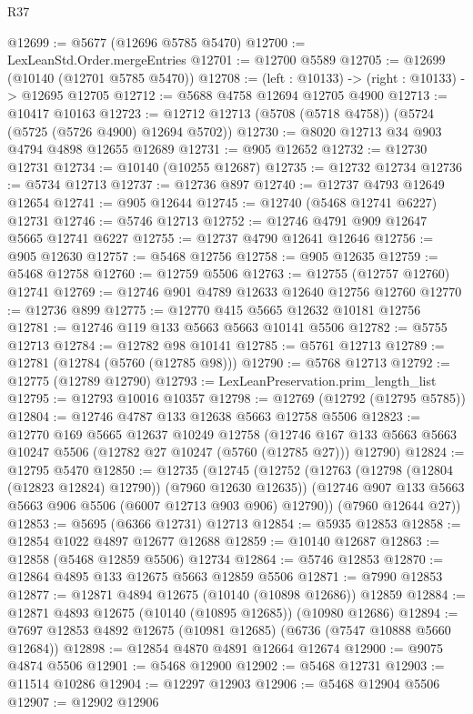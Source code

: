 \begin{lexlean}{R37}
\begin{coremodule}
@12699 := @5677 (@12696 @5785 @5470)
@12700 := LexLeanStd.Order.mergeEntries
@12701 := @12700 @5589
@12705 := @12699 (@10140 (@12701 @5785 @5470))
@12708 := (left : @10133) -> (right : @10133) -> @12695 @12705
@12712 := @5688 @4758 @12694 @12705 @4900
@12713 := @10417 @10163
@12723 := @12712 @12713 (@5708 (@5718 @4758)) (@5724 (@5725 (@5726 @4900) @12694 @5702))
@12730 := @8020 @12713 @34 @903 @4794 @4898 @12655 @12689
@12731 := @905 @12652
@12732 := @12730 @12731
@12734 := @10140 (@10255 @12687)
@12735 := @12732 @12734
@12736 := @5734 @12713
@12737 := @12736 @897
@12740 := @12737 @4793 @12649 @12654
@12741 := @905 @12644
@12745 := @12740 (@5468 @12741 @6227) @12731
@12746 := @5746 @12713
@12752 := @12746 @4791 @909 @12647 @5665 @12741 @6227
@12755 := @12737 @4790 @12641 @12646
@12756 := @905 @12630
@12757 := @5468 @12756
@12758 := @905 @12635
@12759 := @5468 @12758
@12760 := @12759 @5506
@12763 := @12755 (@12757 @12760) @12741
@12769 := @12746 @901 @4789 @12633 @12640 @12756 @12760
@12770 := @12736 @899
@12775 := @12770 @415 @5665 @12632 @10181 @12756
@12781 := @12746 @119 @133 @5663 @5663 @10141 @5506
@12782 := @5755 @12713
@12784 := @12782 @98 @10141
@12785 := @5761 @12713
@12789 := @12781 (@12784 (@5760 (@12785 @98)))
@12790 := @5768 @12713
@12792 := @12775 (@12789 @12790)
@12793 := LexLeanPreservation.prim_length_list
@12795 := @12793 @10016 @10357
@12798 := @12769 (@12792 (@12795 @5785))
@12804 := @12746 @4787 @133 @12638 @5663 @12758 @5506
@12823 := @12770
    @169
    @5665
    @12637
    @10249
    @12758
    (@12746 @167 @133 @5663 @5663 @10247 @5506 (@12782 @27 @10247 (@5760 (@12785 @27))) @12790)
@12824 := @12795 @5470
@12850 := @12735
    (@12745
      (@12752
        (@12763 (@12798 (@12804 (@12823 @12824) @12790)) (@7960 @12630 @12635))
        (@12746 @907 @133 @5663 @5663 @906 @5506 (@6007 @12713 @903 @906) @12790))
      (@7960 @12644 @27))
@12853 := @5695 (@6366 @12731) @12713
@12854 := @5935 @12853
@12858 := @12854 @1022 @4897 @12677 @12688
@12859 := @10140 @12687
@12863 := @12858 (@5468 @12859 @5506) @12734
@12864 := @5746 @12853
@12870 := @12864 @4895 @133 @12675 @5663 @12859 @5506
@12871 := @7990 @12853
@12877 := @12871 @4894 @12675 (@10140 (@10898 @12686)) @12859
@12884 := @12871 @4893 @12675 (@10140 (@10895 @12685)) (@10980 @12686)
@12894 := @7697 @12853 @4892 @12675 (@10981 @12685) (@6736 (@7547 @10888 @5660 @12684))
@12898 := @12854 @4870 @4891 @12664 @12674
@12900 := @9075 @4874 @5506
@12901 := @5468 @12900
@12902 := @5468 @12731
@12903 := @11514 @10286
@12904 := @12297 @12903
@12906 := @5468 @12904 @5506
@12907 := @12902 @12906

\end{coremodule}
\end{lexlean}

